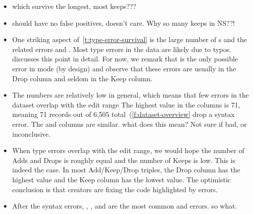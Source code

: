 \documentclass[english,submission,cleveref]{programming}
\begin{document}
\begin{itemize}
  \item
    \FILL{} which survive the longest, most keeps???

  \item
    \FILL{} \mnonstrict{} should have no false positives,
    \mstrict{} doesn't care.
    Why so many keeps in NS??!

  \item
    One striking aspect of~\cref{t:type-error-survival} is the large number
    of s and the related errors  and
    .
    Most type errors in the data are likely due to typos.
     discusses this point in detail.
    For now, we remark that  is the only possible error
    in \mnocheck{} mode (by design) and observe that these errors are
    usually in the Drop column and seldom in the Keep column.

  \item
    The numbers are relatively low in general, which means that
    few errors in the dataset overlap with the edit range
    The highest value in the \mstrict{} columns is 71, meaning 71 records
    out of 6,505 total~(\cref{f:dataset-overview} drop a syntax error.
    The \mnonstrict{} and \mnocheck{} columns are similar.
    \FILL{} what does this mean? Not sure if bad, or inconclusive.

  \item
    When type errors overlap with the edit range,
    we would hope the number of Adds and Drops is roughly
    equal and the number of Keeps is low.
    This is indeed the case.
    In most Add/Keep/Drop triples, the Drop column has the highest
    value and the Keep column has the lowest value.
    The optimistic conclusion is that creators are fixing the code
    highlighted by errors.


  \item
    After the syntax errors, ,
    , and  are the most common
    \mnonstrict{} and \mstrict{} errors.
    \FILL{} so what.


\end{itemize}
\end{document}

